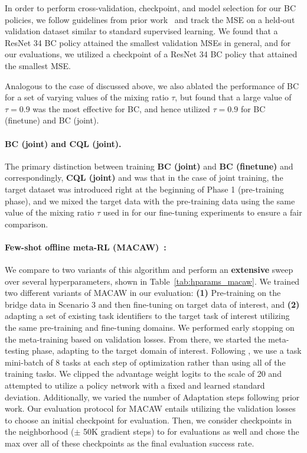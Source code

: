 \documentclass[../thesis.tex]{subfiles}
\begin{document}
In order to perform cross-validation, checkpoint, and model selection for our BC policies, we follow guidelines from prior work~\citep{ebert2021bridge,emmons2021rvs} and track the MSE on a held-out validation dataset similar to standard supervised learning. We found that a ResNet 34 BC policy attained the smallest validation MSEs in general, and for our evaluations, we utilized a checkpoint of a ResNet 34 BC policy that attained the smallest MSE.   

Analogous to the case of \ptrmethodname discussed above, we also ablated the performance of BC for a set of varying values of the mixing ratio $\tau$, but found that a large value of $\tau = 0.9$ was the most effective for BC, and hence utilized $\tau = 0.9$ for BC (finetune) and BC (joint).

\paragraph{BC (joint) and CQL (joint).} The primary distinction between training \textbf{BC (joint)} and \textbf{BC (finetune)} and correspondingly, \textbf{CQL (joint)} and \ptrmethodname was that in the case of joint training, the target dataset was introduced right at the beginning of Phase 1 (pre-training phase), and we mixed the target data with the pre-training data using the same value of the mixing ratio $\tau$ used in for our fine-tuning experiments to ensure a fair comparison.


\paragraph{Few-shot offline meta-RL (MACAW)~\citep{2020arXiv200806043M}:} We compare to two variants of this algorithm and perform an \textbf{extensive} sweep over several hyperparameters, shown in Table~\ref{tab:hparams_macaw}. 
We trained two different variants of MACAW in our evaluation: \textbf{(1)} Pre-training on the bridge data in Scenario 3 and then fine-tuning on target data of interest, and \textbf{(2)} adapting a set of existing task identifiers to the target task of interest utilizing the same pre-training and fine-tuning domains. We performed early stopping on the meta-training based on validation losses. From there, we started the meta-testing phase, adapting to the target domain of interest. Following \citet{2020arXiv200806043M}, we use a task mini-batch of 8 tasks at each step of optimization rather than using all of the training tasks. We clipped the advantage weight logits to the scale of 20 and attempted to utilize a policy network with a fixed and learned standard deviation. Additionally, we varied the number of Adaptation steps following prior work. Our evaluation protocol for MACAW entails utilizing the validation losses to choose an initial checkpoint for evaluation. Then, we consider checkpoints in the neighborhood ($\pm$ 50K gradient steps) to for evaluations as well and chose the max over all of these checkpoints as the final evaluation success rate.
\end{document}
